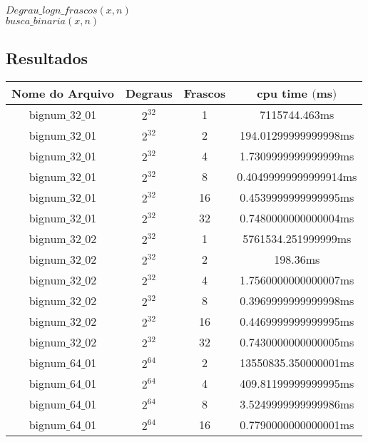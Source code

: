 \documentclass[10pt,a4paper]{article}
\begin{document}
$Degrau\_logn\_frascos(x,n)$\\
					

	\hspace{1cm}$busca\_binaria(x,n)$
	
	

	\subsection*{Resultados}

	\vspace{0.5cm}	
	
	\begin{center}
		\begin{tabular}{|c|c|c|c|}
			\hline
			Nome do Arquivo & Degraus & Frascos & cpu time $($ms$)$ \\
			\hline
			bignum$\_$32$\_$01 & $2^{32}$ & 1 & 7115744.463ms \\
			\hline
			bignum$\_$32$\_$01 & $2^{32}$ & 2 & 194.01299999999998ms \\
			\hline
			bignum$\_$32$\_$01 & $2^{32}$ & 4 & 1.7309999999999999ms \\
			\hline
			bignum$\_$32$\_$01 & $2^{32}$ & 8 & 0.40499999999999914ms \\
			\hline
			bignum$\_$32$\_$01 & $2^{32}$ & 16 & 0.4539999999999995ms \\
			\hline
			bignum$\_$32$\_$01 & $2^{32}$ & 32 & 0.7480000000000004ms \\
			\hline
			bignum$\_$32$\_$02 & $2^{32}$ & 1 & 5761534.251999999ms \\
			\hline
			bignum$\_$32$\_$02 & $2^{32}$ & 2 & 198.36ms \\
			\hline
			bignum$\_$32$\_$02 & $2^{32}$ & 4 & 1.7560000000000007ms \\
			\hline
			bignum$\_$32$\_$02 & $2^{32}$ & 8 & 0.3969999999999998ms \\
			\hline
			bignum$\_$32$\_$02 & $2^{32}$ & 16 & 0.4469999999999995ms \\
			\hline
			bignum$\_$32$\_$02 & $2^{32}$ & 32 & 0.7430000000000005ms \\
			\hline
			bignum$\_$64$\_$01 & $2^{64}$ & 2 & 13550835.350000001ms \\
			\hline
			bignum$\_$64$\_$01 & $2^{64}$ & 4 & 409.81199999999995ms \\
			\hline
			bignum$\_$64$\_$01 & $2^{64}$ & 8 & 3.5249999999999986ms \\
			\hline
			bignum$\_$64$\_$01 & $2^{64}$ & 16 & 0.7790000000000001ms \\

\end{tabular}
\end{center}
\end{document}
